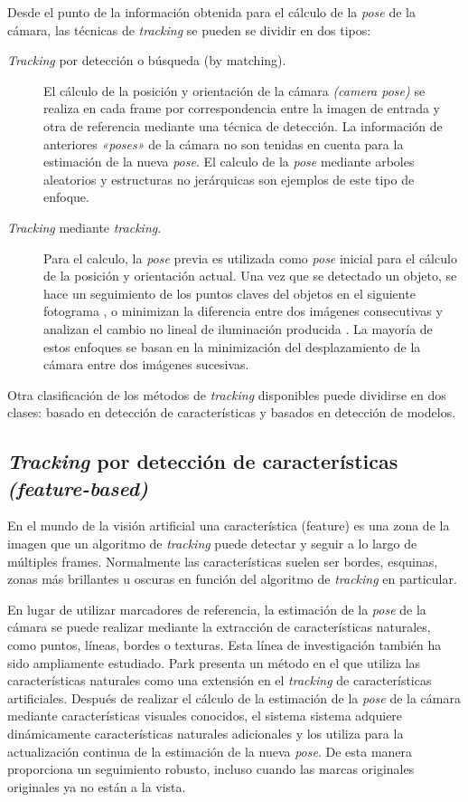 Desde el punto de la información obtenida para el cálculo de la \textit{pose} de la cámara, las técnicas de \textit{tracking} se pueden se dividir en dos tipos:

\begin{description}
\item [\textit{Tracking} por detección o búsqueda (by matching).] El cálculo de la posición y orientación de la cámara \textit{(camera pose)} se realiza en cada frame por correspondencia entre la imagen de entrada y otra de referencia mediante una técnica de detección. La información de anteriores \textit{«poses»} de la cámara no son tenidas en cuenta para la estimación de la nueva \textit{pose}. El calculo de la \textit{pose} mediante arboles aleatorios \cite{Lepetit} y estructuras no jerárquicas \cite{Ozuysal} son ejemplos de este tipo de enfoque.

\item [\textit{Tracking} mediante \textit{tracking}.] Para el calculo, la \textit{pose} previa es utilizada como \textit{pose} inicial para el cálculo de la posición y orientación actual. Una vez que se detectado un objeto, se hace un seguimiento de los puntos claves del objetos en el siguiente fotograma \cite{Wagner}, o minimizan la diferencia entre dos imágenes consecutivas \cite{Park} y analizan el cambio no lineal de iluminación producida \cite{Dame}. La mayoría de estos enfoques se basan en la minimización del desplazamiento de la cámara entre dos imágenes sucesivas.

\end{description}

Otra clasificación de los métodos de \textit{tracking} disponibles puede dividirse en dos clases: basado en detección de características y basados en detección de modelos.

\subsection{\textit{Tracking} por detección de características \emph{(feature-based)}}
En el mundo de la visión artificial una característica (feature) es una zona de la imagen que un algoritmo de \textit{tracking} puede detectar y seguir a lo largo de múltiples frames. Normalmente las características suelen ser bordes, esquinas, zonas más brillantes u oscuras en función del algoritmo de \textit{tracking} en particular.

En lugar de utilizar marcadores de referencia, la estimación de la \textit{pose} de la cámara se puede realizar mediante la extracción de características naturales, como puntos, líneas, bordes o texturas. Esta línea de investigación también ha sido ampliamente estudiado. Park \cite{Park3} presenta un método en el que utiliza las características naturales como una extensión en el \textit{tracking} de características artificiales. Después de realizar el cálculo de la estimación de la \textit{pose} de la cámara mediante características visuales conocidos, el sistema sistema adquiere dinámicamente características naturales adicionales y los utiliza para la actualización continua de la estimación de la nueva \textit{pose}. De esta manera proporciona un seguimiento robusto, incluso cuando las marcas originales originales ya no están a la vista.

